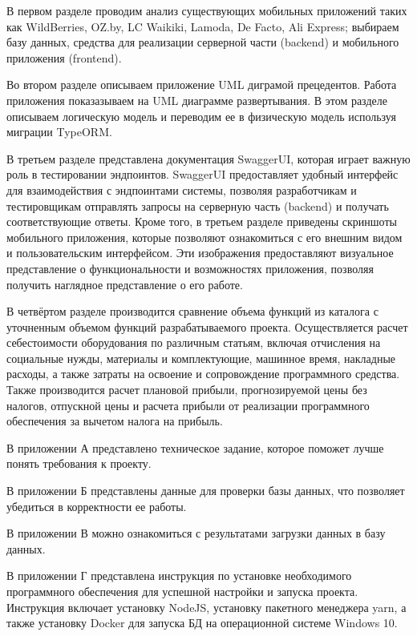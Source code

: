 В первом разделе
проводим анализ существующих мобильных приложений таких как
WildBerries, OZ.by, LC Waikiki, Lamoda, De Facto, Ali Express;
выбираем базу данных, средства для реализации серверной части (backend) и мобильного приложения (frontend).

Во втором разделе
описываем приложение UML диграмой прецедентов.
Работа приложения показазываем на UML диаграмме развертывания.
В этом разделе описываем логическую модель и переводим ее в физическую модель используя миграции TypeORM.

В третьем разделе
представлена документация SwaggerUI, которая играет важную роль в тестировании эндпоинтов.
SwaggerUI предоставляет удобный интерфейс для взаимодействия с эндпоинтами системы,
позволяя разработчикам и тестировщикам отправлять запросы на серверную часть (backend)
и получать соответствующие ответы.
Кроме того, в третьем разделе приведены скриншоты мобильного приложения,
которые позволяют ознакомиться с его внешним видом и пользовательским интерфейсом.
Эти изображения предоставляют визуальное представление о функциональности и возможностях приложения,
позволяя получить наглядное представление о его работе.

В четвёртом разделе
производится сравнение объема функций из каталога с уточненным объемом функций разрабатываемого проекта.
Осуществляется расчет себестоимости оборудования по различным статьям,
включая отчисления на социальные нужды, материалы и комплектующие,
машинное время, накладные расходы, а также затраты на освоение и сопровождение программного средства.
Также производится расчет плановой прибыли, прогнозируемой цены без налогов, отпускной цены и
расчета прибыли от реализации программного обеспечения за вычетом налога на прибыль.

В приложении А
представлено техническое задание, которое поможет лучше понять требования к проекту.

В приложении Б
представлены данные для проверки базы данных, что позволяет убедиться в корректности ее работы.

В приложении В
можно ознакомиться с результатами загрузки данных в базу данных.

В приложении Г
представлена инструкция по установке необходимого программного обеспечения для успешной настройки и запуска проекта.
Инструкция включает установку NodeJS, установку пакетного менеджера yarn,
а также установку Docker для запуска БД на операционной системе Windows 10.

